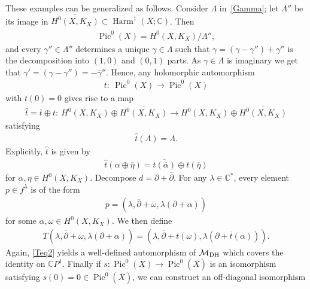 \documentclass[pdftex]{sigma}
\numberwithin{equation}{section}
\begin{document}
These examples can be generalized as follows. Consider $\Lambda$ in~\eqref{Gamma}; let $\Lambda''$ be its image in $\overline{H^0(X, K_X)} \subset \operatorname{Harm}^1(X; {\mathbb C})$. Then
\begin{gather*}\operatorname{Pic}^0(X) = \overline{H^0(X, K_X)}/\Lambda'' ,\end{gather*} and every $\gamma'' \in \Lambda''$ determines a unique $\gamma \in \Lambda$ such that $\gamma = (\gamma-\gamma'')+\gamma''$ is the decomposition into $(1,0)$ and $(0,1)$ parts. As $\gamma \in \Lambda$ is imaginary we get that $\gamma' = (\gamma-\gamma'') = -\overline{\gamma}''$. Hence, any holomorphic automorphism
\begin{gather*}
t \colon  \ \operatorname{Pic}^0(X) \longrightarrow \operatorname{Pic}^0(X)
\end{gather*}
with $t(0) = 0$ gives rise to a map
\begin{gather*}\widehat{t} = \overline{t}\oplus t \colon \ H^0(X, K_X)\oplus \overline{H^0(X, K_X)} \longrightarrow H^0(X, K_X)\oplus
\overline{H^0(X, K_X)}\end{gather*}
satisfying
\begin{gather*}\widehat{t}(\Lambda) = \Lambda .\end{gather*}
Explicitly, $\widehat t$ is given by
\begin{gather*}\widehat t(\alpha\oplus\overline{\eta}) = \overline{ t(\overline{\alpha})}\oplus
t(\overline{\eta})
\end{gather*}
for $\alpha,\eta\in H^0(X, K_X)$. Decompose $d = \partial+\overline{\partial}$. For any $\lambda \in \mathbb C^*$, every element $p \in f^\lambda$ is of the form
\begin{gather*}p = (\lambda, \overline{\partial}+\overline{\omega}, \lambda(\partial+\alpha))\end{gather*}
for some $\alpha, \omega \in H^0(X, K_X) $. We then def\/ine
\begin{gather}\label{Teq2}
T(\lambda, \overline{\partial}+\overline{\omega}, \lambda(\partial+\alpha)) = (\lambda, \overline{\partial}+t(\overline{\omega}),  \lambda(\partial+\overline{t}(\alpha))).
\end{gather}
Again, \eqref{Teq2} yields a well-def\/ined automorphism of ${\mathcal M}_{\rm DH}$ which covers the identity on ${\mathbb C}P^1$. Finally if $s \colon \operatorname{Pic}^0(X) \longrightarrow \operatorname{Pic}^0(\overline{X})$ is an isomorphism satisfying $s(0) = 0 \in \operatorname{Pic}^0(\overline{X})$, we can construct an of\/f-diagonal isomorphism
\end{document}
